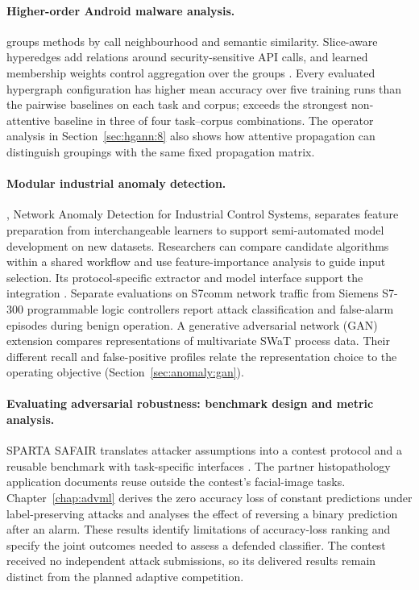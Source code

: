 \paragraph{Higher-order Android malware analysis.}
\hgann{} groups methods by call neighbourhood and semantic similarity. Slice-aware
hyperedges add relations around security-sensitive API calls, and learned membership
weights control aggregation over the groups \cite{norouzian2025hgannmal}.
Every evaluated hypergraph configuration has higher mean accuracy over five training runs than the pairwise
baselines on each task and corpus; \hgann{} exceeds the strongest non-attentive baseline in three of four
task--corpus combinations. The operator analysis in Section~\ref{sec:hgann:8} also shows
how attentive propagation can distinguish groupings with the same fixed propagation
matrix. 

\paragraph{Modular industrial anomaly detection.}
\nadics{}, Network Anomaly Detection for Industrial Control Systems, separates feature
preparation from interchangeable learners to support semi-automated model development on new
datasets. Researchers can compare candidate algorithms within a shared workflow and use
feature-importance analysis to guide input selection. Its protocol-specific extractor and model
interface support the \iuno{} integration \cite{iuno_ap4,iuno_ap7}. Separate evaluations
on S7comm network traffic \cite{kleinmann2014accurate} from Siemens S7-300 programmable logic
controllers report attack classification and false-alarm episodes during benign operation.
A generative adversarial network (GAN) extension compares representations of multivariate
SWaT process data. Their different recall and false-positive profiles relate the
representation choice to the operating objective (Section~\ref{sec:anomaly:gan}).

\paragraph{Evaluating adversarial robustness: benchmark design and metric analysis.}
SPARTA SAFAIR translates attacker assumptions into a contest protocol and a reusable benchmark
with task-specific interfaces \cite{sparta2021d73,sparta2022d76}. The partner
histopathology application documents reuse outside the contest's facial-image tasks.
Chapter~\ref{chap:advml} derives the zero accuracy loss of constant predictions under
label-preserving attacks and analyses the effect of reversing a binary prediction after
an alarm. These results identify limitations of accuracy-loss ranking and specify the
joint outcomes needed to assess a defended classifier. The contest received no independent
attack submissions, so its delivered results remain distinct from the planned adaptive
competition.

